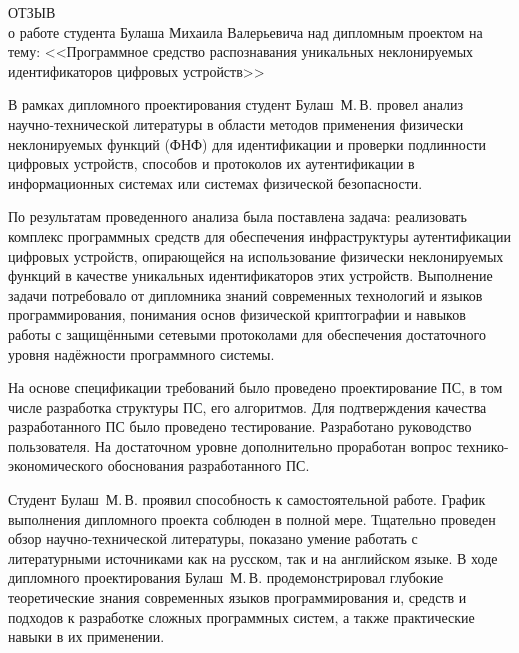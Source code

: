 \thispagestyle{empty}

{\small
  \begin{center}
    \begin{minipage}{0.8\textwidth}
      \begin{center}
        {\normalsize ОТЗЫВ}\\[1em]
        о работе студента Булаша Михаила Валерьевича
        над дипломным проектом
        на тему:
        <<Программное средство распознавания уникальных неклонируемых идентификаторов цифровых устройств>>
      \end{center}
    \end{minipage}
  \end{center}

В рамках дипломного проектирования студент Булаш~М.\,В. провел анализ научно-технической литературы в области методов применения физически неклонируемых функций (ФНФ) для идентификации и проверки подлинности цифровых устройств, способов и протоколов их аутентификации в информационных системах или системах физической безопасности.

По результатам проведенного анализа была поставлена задача: реализовать комплекс программных средств для обеспечения инфраструктуры аутентификации цифровых устройств, опирающейся на использование физически неклонируемых функций в качестве уникальных идентификаторов этих устройств. Выполнение задачи потребовало от дипломника знаний современных технологий и языков программирования, понимания основ физической криптографии и навыков работы с защищёнными сетевыми протоколами для обеспечения достаточного уровня надёжности программного системы.

На основе спецификации требований было проведено проектирование ПС, в том числе разработка структуры ПС, его алгоритмов. Для подтверждения качества разработанного ПС было проведено тестирование. Разработано руководство пользователя. На достаточном уровне дополнительно проработан вопрос технико-экономического обоснования разработанного ПС.


Студент Булаш~М.\,В. проявил способность к самостоятельной работе. График выполнения дипломного проекта соблюден в полной мере.  Тщательно проведен обзор научно-технической литературы, показано умение работать с литературными источниками как на русском, так и на английском языке. В ходе дипломного проектирования Булаш~М.\,В. продемонстрировал глубокие теоретические знания современных языков программирования и, средств и подходов к разработке сложных программных систем, а также практические навыки в их применении.

}
